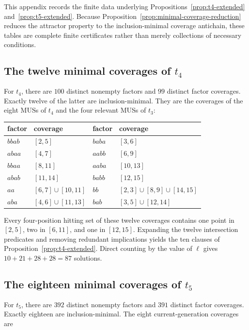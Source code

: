 \documentclass[11pt,a4paper]{article}
\theoremstyle{definition}\newtheorem{definition}[theorem]{Definition}
\theoremstyle{remark}\newtheorem{remark}[theorem]{Remark}
\begin{document}
This appendix records the finite data underlying Propositions~\ref{prop:t4-extended} and~\ref{prop:t5-extended}.  Because Proposition~\ref{prop:minimal-coverage-reduction} reduces the attractor property to the inclusion-minimal coverage antichain, these tables are complete finite certificates rather than merely collections of necessary conditions.

\subsection{The twelve minimal coverages of \texorpdfstring{$t_4$}{t4}}

For $t_4$, there are $100$ distinct nonempty factors and $99$ distinct factor coverages.  Exactly twelve of the latter are inclusion-minimal.  They are the coverages of the eight MUSs of $t_4$ and the four relevant MUSs of $t_3$:

\begin{center}
\begin{tabular}{ll@{\qquad}ll}
\toprule
factor & coverage & factor & coverage\\
\midrule
$bbab$ & $[2,5]$ & $baba$ & $[3,6]$\\
$abaa$ & $[4,7]$ & $aabb$ & $[6,9]$\\
$bbaa$ & $[8,11]$ & $aaba$ & $[10,13]$\\
$abab$ & $[11,14]$ & $babb$ & $[12,15]$\\
$aa$ & $[6,7]\cup[10,11]$ & $bb$ & $[2,3]\cup[8,9]\cup[14,15]$\\
$aba$ & $[4,6]\cup[11,13]$ & $bab$ & $[3,5]\cup[12,14]$\\
\bottomrule
\end{tabular}
\end{center}

Every four-position hitting set of these twelve coverages contains one point in $[2,5]$, two in $[6,11]$, and one in $[12,15]$.  Expanding the twelve intersection predicates and removing redundant implications yields the ten clauses of Proposition~\ref{prop:t4-extended}.  Direct counting by the value of $\ell$ gives $10+21+28+28=87$ solutions.

\subsection{The eighteen minimal coverages of \texorpdfstring{$t_5$}{t5}}

For $t_5$, there are $392$ distinct nonempty factors and $391$ distinct factor coverages.  Exactly eighteen are inclusion-minimal.  The eight current-generation coverages are
\end{document}
